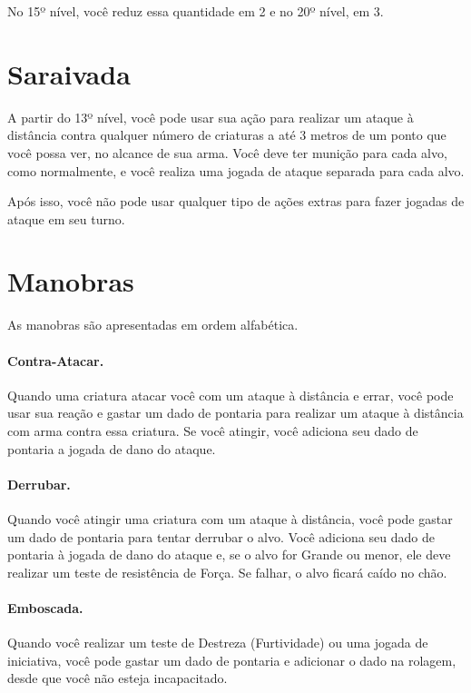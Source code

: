 \begin{multicols}{2}
No 15º nível, você reduz essa quantidade em 2 e no 20º nível, em 3.


\section*{Saraivada}%

A partir do 13º nível, você pode usar sua ação para realizar um ataque à
distância contra qualquer número de criaturas a até 3 metros de um ponto que
você possa ver, no alcance de sua arma. Você deve ter munição para cada alvo,
como normalmente, e você realiza uma jogada de ataque separada para cada alvo.

Após isso, você não pode usar qualquer tipo de ações extras para fazer jogadas
de ataque em seu turno.

\section*{Manobras}%

As manobras são apresentadas em ordem alfabética.

\paragraph{Contra-Atacar.}%

Quando uma criatura atacar você com um ataque à distância e errar, você pode
usar sua reação e gastar um dado de pontaria para realizar um ataque à distância
com arma contra essa criatura. Se você atingir, você adiciona seu dado de
pontaria a jogada de dano do ataque.

\paragraph{Derrubar.}%

Quando você atingir uma criatura com um ataque à distância, você pode gastar um
dado de pontaria para tentar derrubar o alvo. Você adiciona seu dado de pontaria
à jogada de dano do ataque e, se o alvo for Grande ou menor, ele deve realizar
um teste de resistência de Força. Se falhar, o alvo ficará caído no chão.

\paragraph{Emboscada.}%

Quando você realizar um teste de Destreza (Furtividade) ou uma jogada de
iniciativa, você pode gastar um dado de pontaria e adicionar o dado na rolagem,
desde que você não esteja incapacitado.


\end{multicols}
